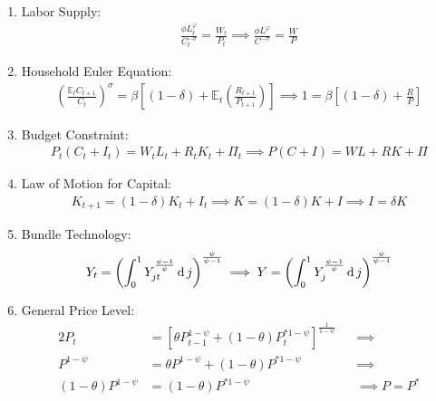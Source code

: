 \documentclass[../thesis.tex]{subfiles}
\begin{document}
	\begin{enumerate}
		\item Labor Supply:
		\begin{align}
			\label{eq_v0:ss-household-labor-supply}
			\frac{\phi L_t^{\varphi}}{C_t^{-\sigma}} = \frac{W_t}{P_t} \implies
			\frac{\phi L^{\varphi}}{C^{-\sigma}} = \frac{W}{P}
		\end{align}
		
		\item Household Euler Equation: 
		\begin{align}
			\label{eq_v0:ss-household-euler-equation}
			\left( \frac{\mathbb{E}_t C_{t+1}}{C_t} \right)^\sigma = \beta \left[ (1-\delta) + \mathbb{E}_t \left(\frac{R_{t+1}}{P_{t+1}}\right) \right] \implies 
			1 = \beta \left[ (1-\delta) + \frac{R}{P} \right]
		\end{align}
		
		\item Budget Constraint: 
		\begin{align}
			\label{eq_v0:ss-household-budget-constraint}
			P_t (C_t + I_t) = W_t L_t + R_t K_t + \Pi_t \implies 
			P (C + I) = W L + R K + \Pi
		\end{align}
		
		\item Law of Motion for Capital:
		\begin{align}
			\label{eq_v0:ss-law-of-motion-for-capital}
			K_{t+1} = (1-\delta)K_t + I_t \implies
			K = (1-\delta)K + I \implies I = \delta K
		\end{align}
		
		\item Bundle Technology:
		\begin{align}
			\label{eq_v0:ss-final-good-firm-bundle-rule}
			Y_t = \left( \int_{0}^{1} Y_{jt}^{\frac{\psi-1}{\psi}} \operatorname{d} j \right)^{\frac{\psi}{\psi-1}} \implies 
			Y = \left( \int_{0}^{1} Y_{j}^{\frac{\psi-1}{\psi}} \operatorname{d} j \right)^{\frac{\psi}{\psi-1}}
		\end{align}
		
		\item General Price Level:
		\begin{alignat}{2}
			\label{eq_v0:ss-general-price-level}
			P_t &= \left[ \theta P_{t-1}^{1-\psi} + (1-\theta) P_t^{\ast 1-\psi} \right]^\frac{1}{1-\psi} &&\implies \nonumber \\
			P^{1-\psi} &= \theta P^{1-\psi} + (1-\theta) P^{\ast 1-\psi} &&\implies \nonumber \\ 
			(1-\theta) P^{1-\psi} &= (1-\theta) P^{\ast 1-\psi} &&\implies P = P^\ast
		\end{alignat}
		

\end{enumerate}
\end{document}
